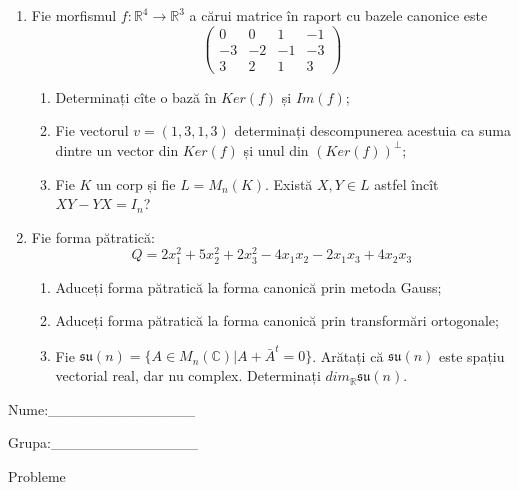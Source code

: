 \documentclass{article}
\begin{document}
\begin{enumerate}
 \item Fie morfismul $f:\mathbb{R}^4 \to \mathbb{R}^3$ a cărui matrice în raport cu bazele canonice este
$$\begin{pmatrix}
0&0&1&-1\\
-3&-2&-1&-3\\
3&2&1&3
\end{pmatrix}$$

\begin{enumerate}
\item Determinați cîte o bază în $Ker(f)$ și $Im(f)$;
\item Fie vectorul $v=(1,3,1,3)$ determinați descompunerea acestuia ca suma dintre un vector din $Ker(f)$ și unul din $(Ker(f))^\perp$;
\item Fie $K$ un corp și fie $L=M_n(K)$. Există $X,Y \in L$ astfel încît $XY-YX=I_n$?  
\end{enumerate}
\item Fie forma pătratică:
$$Q= 2x_1^2+5x_2^2+2x_3^2-4x_1x_2-2x_1x_3+4x_2x_3$$

\begin{enumerate}
\item Aduceți forma pătratică la forma canonică prin metoda Gauss;
\item Aduceți forma pătratică la forma canonică prin transformări ortogonale;
\item Fie $\mathfrak{su}(n)=\{ A \in M_n(\mathbb{C}) | A+\bar{A}^t=0\}$. Arătați că $\mathfrak{su}(n)$ este spațiu vectorial real, dar nu complex.
Determinați $dim_{\mathbb{R}}\mathfrak{su}(n)$.
\end{enumerate}
\end{enumerate}
\newpage
\begin{flushright}
Nume:\_\_\_\_\_\_\_\_\_\_\_\_\_\_
 
 
Grupa:\_\_\_\_\_\_\_\_\_\_\_\_\_\_
\end{flushright}
\begin{center}
\vspace{2cm}
{\Large Probleme}
\vspace{2cm}
\end{center}
\end{document}
